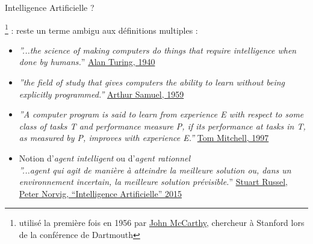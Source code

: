 \documentclass[10pt,serif,mathserif,compress,hyperref={colorlinks}]{beamer}
\begin{document}
\begin{frame}{Intelligence Artificielle ?}

  \footnote{{\tiny utilisé la première fois en 1956 par \href{https://en.wikipedia.org/wiki/John\_McCarthy\_\%28computer\_scientist\%29}{John McCarthy},
      chercheur à Stanford lors de la conférence de Dartmouth}} :
  reste un terme ambigu aux définitions multiples :

  \begin{itemize}

  \item <2-> {\em ''...the science of making computers do things that require intelligence when done by humans.}''
    {\tiny \href{http://www.alanturing.net/turing\_archive/pages/reference\%20articles/what\%20is\%20ai.html}{Alan Turing, 1940}}\\[3mm]    

  \item <2-> {\em ''the field of study that gives computers the ability to learn without being explicitly programmed.''}
        {\tiny  \href{http://infolab.stanford.edu/pub/voy/museum/samuel.html}{Arthur Samuel, 1959}}

  \item <2-> {\em ''A computer program is said to learn from experience E with respect to some class of tasks T and performance measure P,
    if its performance at tasks in T, as measured by P, improves with experience E.''}
    {\tiny \href{https://www.cs.cmu.edu/~tom/}{Tom Mitchell, 1997}}

  \item <2-> Notion d'{\em agent intelligent} ou d'{\em agent rationnel}\\
    {\em ''...agent qui agit de manière à
    atteindre la meilleure solution ou, dans un environnement incertain, la meilleure solution prévisible.}''
    {\tiny  \hyperlink{refRusselNorvig}{Stuart Russel, Peter Norvig, ``Intelligence Artificielle'' 2015}}

  \end{itemize}

\end{frame}
\end{document}
